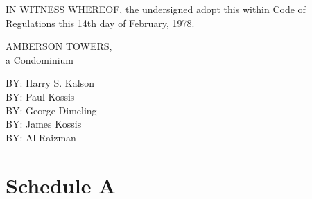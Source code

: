 \documentclass[
  14pt,
]{book}
\begin{document}
IN WITNESS WHEREOF, the undersigned adopt this within Code of Regulations this 14th day of February, 1978.

AMBERSON TOWERS,\\
a Condominium

BY: Harry S. Kalson\\
BY: Paul Kossis\\
BY: George Dimeling\\
BY: James Kossis\\
BY: Al Raizman

\hypertarget{schedule-a}{%
\section*{Schedule A}\label{schedule-a}}
\end{document}
